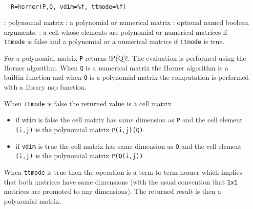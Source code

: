 \begin{mandesc}
   \\ %
\end{mandesc}
\begin{calling_sequence}
\begin{verbatim}
  R=horner(P,Q, vdim=%f, ttmode=%f)
\end{verbatim}
\end{calling_sequence}
\begin{parameters}
  \begin{varlist}
    : polynomial matrix
    : a polynomial or numerical matrix
    : optional named boolean arguments.
    : a cell whose elements are  polynomial or numerical matrices 
    if \verb!ttmode! is false and a  polynomial or a numerical matrice if 
    \verb!ttmode! is true.
  \end{varlist}
\end{parameters}
\begin{mandescription}
  For a polynomial matrix \verb!P! returns !P(Q)!. The evaluation 
  is performed using the Horner algorithm. When \verb!Q! is a 
  numerical matrix the Horner algorithm is a builtin function 
  and when \verb!Q! is a  polynomial matrix the computation is 
  performed with a library nsp function. 
  
  When \verb!ttmode! is false the returned value is a cell matrix 
  \begin{itemize}
    \item if \verb!vdim! is false the cell matrix has same dimension 
      as \verb!P! and the cell element \verb!(i,j)! is the polynomial
      matrix \verb!P(i,j)(Q)!. 
    \item if \verb!vdim! is true the cell matrix has same dimension 
      as \verb!Q! and the cell element \verb!(i,j)! is the polynomial
      matrix \verb!P(Q(i,j))!.
  \end{itemize}
  
  When \verb!ttmode! is true then the operation is a term to term 
  horner which implies that both matrices have same dimensions (with 
  the usual convention that \verb!1x1! matrices are promoted 
  to any dimensions).  The returned result is then a polynomial matrix. 
  
\end{mandescription}
